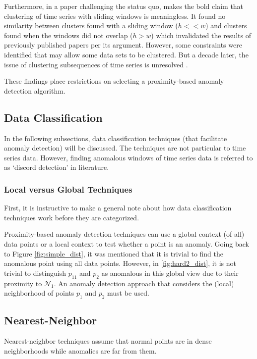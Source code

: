 Furthermore, in a paper challenging the status quo, \cite{Keogh2004} makes the bold claim that clustering of time series with sliding windows is meaningless. It found no similarity between clusters found with a sliding window ($h<<w$) and clusters found when the windows did not overlap ($h>w$) which invalidated the results of previously published papers per its argument. However, some constraints were identified that may allow some data sets to be clustered. But a decade later, the issue of clustering subsequences of time series is unresolved \cite{Zolhavarieh2014}.

These findings place restrictions on selecting a proximity-based anomaly detection algorithm.


\subsection{Data Classification}

In the following subsections, data classification techniques (that facilitate anomaly detection) will be discussed. The techniques are not particular to time series data. However, finding anomalous windows of time series data is referred to as `discord detection' in literature.

\subsubsection{Local versus Global Techniques}

First, it is instructive to make a general note about how data classification techniques work before they are categorized.

Proximity-based anomaly detection techniques can use a global context (of all) data points or a local context to test whether a point is an anomaly. Going back to Figure \ref{fig:simple_dist}, it was mentioned that it is trivial to find the anomalous point using all data points. However, in \ref{fig:hard2_dist}, it is not trivial to distinguish $p_11$ and $p_2$ as anomalous in this global view due to their proximity to $\mathcal{N}_1$. An anomaly detection approach that considers the (local) neighborhood of points $p_1$ and $p_2$ must be used.

\subsection{Nearest-Neighbor}

Nearest-neighbor techniques assume that normal points are in dense neighborhoods while anomalies are far from them.

